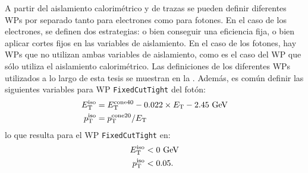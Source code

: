 \begin{table}[ht!]
    \caption{Resumen de los \ac{WP} de aislamiento para electrones y fotones usados a lo largo de esta tesis.}
    \label{fig:objects:egamma:iso:iso_table}
\end{table}

A partir del aislamiento calorimétrico y de trazas se pueden definir diferentes \acp{WP} por separado tanto para electrones como para fotones. En el caso de los electrones, se definen dos estrategias: o bien conseguir una eficiencia fija, o bien aplicar cortes fijos en las variables de aislamiento. En el caso de los fotones, hay \acp{WP} que no utilizan ambas variables de aislamiento, como es el caso del \ac{WP} que sólo utiliza el aislamiento calorimétrico. Las definiciones de los diferentes \acp{WP} utilizados a lo largo de esta tesis se muestran en la \Tab{\ref{fig:objects:egamma:iso:iso_table}}. Además, es común definir las siguientes variables para \ac{WP} \texttt{FixedCutTight} del fotón:
\begin{align}
    E_{\text{T}}^{\text{iso}} &= E_{\text{T}}^{\text{cone40}} - 0.022 \times E_{\text{T}} - 2.45~\text{GeV}\\
    p_{\text{T}}^{\text{iso}} &= p_{\text{T}}^{\text{cone20}} / E_{\text{T}}
\end{align}
lo que resulta para el \ac{WP} \texttt{FixedCutTight} en:
\begin{align}
    E_{\text{T}}^{\text{iso}} &< 0 ~\text{GeV}\\
    p_{\text{T}}^{\text{iso}} &< 0.05.
\end{align}
















